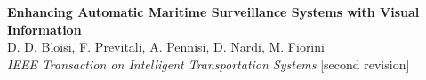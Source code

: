 \begin{frame}
	\vspace{-0.8cm}
	
	\begin{center}
		\hspace{-8cm}
	\end{center}
	
	\vspace{-2.5cm}
	
	\begin{tabbing}
		\hspace{3.8cm}
		\textbf{Enhancing Automatic Maritime Surveillance Systems with Visual Information} \\
		\hspace{3.8cm}
		D. D. Bloisi, F. Previtali, A. Pennisi, D. Nardi, M. Fiorini \\
		\hspace{3.8cm}
		\emph{IEEE Transaction on Intelligent Transportation Systems} [second revision] \\
	\end{tabbing}
\end{frame}

